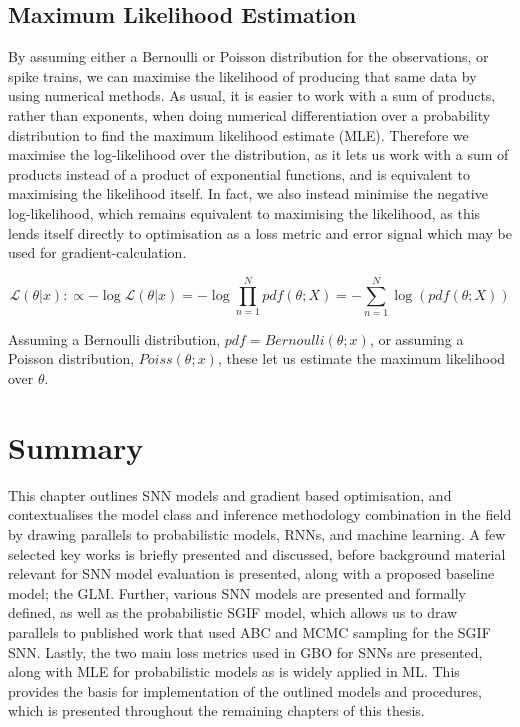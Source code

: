 \documentclass[mphil,deptreport,ianc]{infthesis} %
\begin{document}
\subsection{Maximum Likelihood Estimation}

By assuming either a Bernoulli or Poisson distribution for the observations, or spike trains, we can maximise the likelihood of producing that same data by using numerical methods.
As usual, it is easier to work with a sum of products, rather than exponents, when doing numerical differentiation over a probability distribution to find the maximum likelihood estimate (MLE).
Therefore we maximise the log-likelihood over the distribution, as it lets us work with a sum of products instead of a product of exponential functions, and is equivalent to maximising the likelihood itself.
In fact, we also instead minimise the negative log-likelihood, which remains equivalent to maximising the likelihood, as this lends itself directly to optimisation as a loss metric and error signal which may be used for gradient-calculation.

\begin{equation}
    \mathcal{L}(\theta | x) :\propto - \log \mathcal{L}(\theta | x) = - \log \prod_{n=1}^N pdf(\theta; X) = - \sum_{n=1}^N \log (pdf(\theta; X))
\end{equation}

Assuming a Bernoulli distribution, $pdf=Bernoulli(\theta; x)$, or assuming a Poisson distribution, $Poiss(\theta; x)$, these let us estimate the maximum likelihood over $\theta$.


\section{Summary}

This chapter outlines SNN models and gradient based optimisation, and contextualises the model class and inference methodology combination in the field by drawing parallels to probabilistic models, RNNs, and machine learning.
A few selected key works is briefly presented and discussed, before background material relevant for SNN model evaluation is presented, along with a proposed baseline model; the GLM.
Further, various SNN models are presented and formally defined, as well as the probabilistic SGIF model, which allows us to draw parallels to published work that used ABC and MCMC sampling for the SGIF SNN.
Lastly, the two main loss metrics used in GBO for SNNs are presented, along with MLE for probabilistic models as is widely applied in ML.
This provides the basis for implementation of the outlined models and procedures, which is presented throughout the remaining chapters of this thesis.
\end{document}
